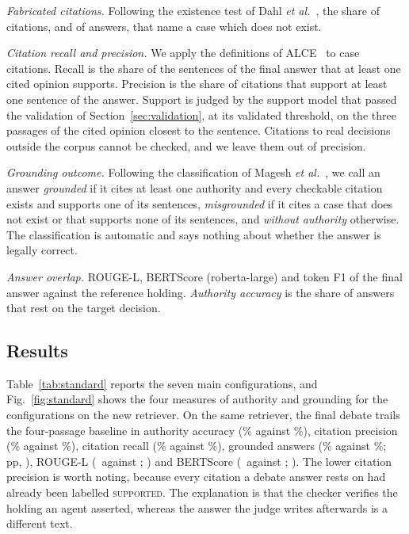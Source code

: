 \documentclass[conference]{IEEEtran}
\newcommand{\pp}{\,pp}
\begin{document}
\emph{Fabricated citations.} Following the existence test of Dahl \emph{et al.}~\cite{dahl2024}, the share of citations, and of answers, that name a case which does not exist.

\emph{Citation recall and precision.} We apply the definitions of ALCE~\cite{alce} to case citations. Recall is the share of the sentences of the final answer that at least one cited opinion supports. Precision is the share of citations that support at least one sentence of the answer. Support is judged by the support model that passed the validation of Section~\ref{sec:validation}, at its validated threshold, on the three passages of the cited opinion closest to the sentence. Citations to real decisions outside the corpus cannot be checked, and we leave them out of precision.

\emph{Grounding outcome.} Following the classification of Magesh \emph{et al.}~\cite{magesh2025}, we call an answer \emph{grounded} if it cites at least one authority and every checkable citation exists and supports one of its sentences, \emph{misgrounded} if it cites a case that does not exist or that supports none of its sentences, and \emph{without authority} otherwise. The classification is automatic and says nothing about whether the answer is legally correct.

\emph{Answer overlap.} ROUGE-L, BERTScore (roberta-large) and token F1 of the final answer against the reference holding. \emph{Authority accuracy} is the share of answers that rest on the target decision.

\subsection{Results}
Table~\ref{tab:standard} reports the seven main configurations, and Fig.~\ref{fig:standard} shows the four measures of authority and grounding for the configurations on the new retriever. On the same retriever, the final debate trails the four-passage baseline in authority accuracy (\ResStdFinalAuthorityAccuracy\% against \ResStdBaseFourRAuthorityAccuracy\%), citation precision (\ResStdFinalCitationPrecision\% against \ResStdBaseFourRCitationPrecision\%), citation recall (\ResStdFinalCitationRecall\% against \ResStdBaseFourRCitationRecall\%), grounded answers (\ResStdFinalGrounded\% against \ResStdBaseFourRGrounded\%; \ResStdCmpFinalBaseFourRGroundedDiff\pp, \ResStdCmpFinalBaseFourRGroundedP), ROUGE-L (\ResStdFinalRougeL\ against \ResStdBaseFourRRougeL; \ResStdCmpFinalBaseFourRRougeLP) and BERTScore (\ResStdFinalBertScore\ against \ResStdBaseFourRBertScore; \ResStdCmpFinalBaseFourRBertScoreP). The lower citation precision is worth noting, because every citation a debate answer rests on had already been labelled \textsc{supported}. The explanation is that the checker verifies the holding an agent asserted, whereas the answer the judge writes afterwards is a different text.
\end{document}
